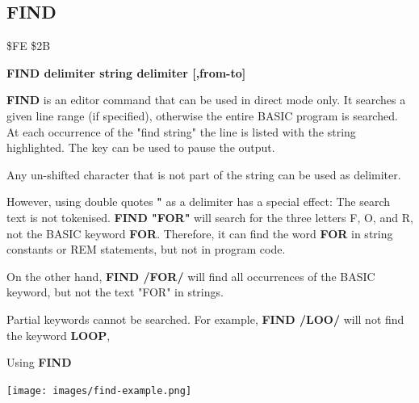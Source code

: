 \subsection{FIND}
\begin{description}[leftmargin=2cm,style=nextline]
\item [Token:] \$FE \$2B
\item [Format:] {\bf FIND {\bf delimiter} string {\bf delimiter} [,from-to]}
\item [Usage:]  {\bf FIND} is an editor command that can be used
                in direct mode only. It searches a given line range
                (if specified), otherwise the entire BASIC program is searched.
                At each occurrence of the "find string" the line is
                listed with the string highlighted.
                The  key can be used to pause the output.

\item [Remarks:] Any un-shifted character that is not part of
                 the string can be used as delimiter.

                 However, using double quotes {\bf "} as a delimiter has a special effect:
                 The search text is not tokenised.
                 {\bf FIND "FOR"} will search for the three letters F, O, and R, not
                 the BASIC keyword {\bf FOR}. Therefore, it can find the word
                 {\bf FOR} in string constants or REM statements, but not
                 in program code.

                 On the other hand, {\bf FIND /FOR/} will find all occurrences of
                 the BASIC keyword, but not the text "FOR" in strings.

                 Partial keywords cannot be searched. For example,
                 {\bf FIND /LOO/} will not find the keyword {\bf LOOP},


\item [Example:] Using {\bf FIND}
\item \begin{center}\texttt{[image: images/find-example.png]}\end{center}
\end{description}


\newpage

